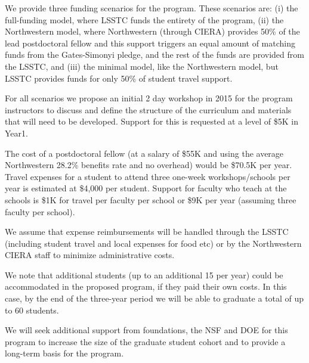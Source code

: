 \documentclass[nofootbib,floatfix,11pt]{article}
\begin{document}
We provide three funding scenarios for the program. These scenarios are: (i) the full-funding model, where LSSTC funds the entirety of the  program, (ii) the Northwestern model, where Northwestern (through CIERA) provides 50\% of the lead postdoctoral fellow and this support triggers an equal amount of matching funds from the Gates-Simonyi pledge, and the rest of the funds are provided from the LSSTC, and (iii) the minimal model, like the Northwestern model, but LSSTC provides funds for only 50\% of student travel support. 

For all scenarios we propose an initial 2 day workshop in 2015 for the program instructors to discuss and define the structure of the curriculum and materials that will need to be developed. Support for this is requested at a level of \$5K in Year1.

The cost of a postdoctoral fellow (at a salary of \$55K and using the average Northwestern 28.2\% benefits rate and no overhead) would be \$70.5K per year. Travel expenses for a student to attend three one-week workshops/schools per year is estimated at \$4,000 per student. Support for faculty who teach at the schools is \$1K for travel per faculty per school or \$9K per year (assuming three faculty per school).

We assume that expense reimbursements will be handled through the LSSTC (including student travel and local expenses for food etc) or by the Northwestern CIERA staff to minimize administrative costs.

We note that additional students (up to an additional 15 per year) could be accommodated in the proposed program, if they paid their own costs. In this case, by the end of the three-year period we will be able to graduate a total of up to 60 students. 

We will seek additional support from foundations, the NSF and DOE for this program to increase the size of the graduate student cohort and to provide a long-term basis for the program.

\end{document}

